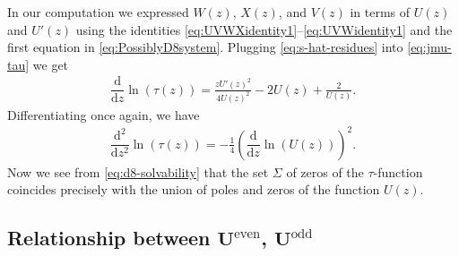 In our computation we expressed $W(z)$, $X(z)$, and $V(z)$ in terms of $U(z)$ and $U'(z)$ using the identities \eqref{eq:UVWXidentity1}--\eqref{eq:UVWidentity1} and the first equation in \eqref{eq:PossiblyD8system}. Plugging \eqref{eq:s-hat-residues} into \eqref{eq:jmu-tau} we get
\begin{gather*}
\dfrac{\mathrm{d}}{\mathrm{d}z}\ln(\tau(z))=\frac{zU'(z)^2}{4U(z)^2}-
 2 U(z)+\frac2{U(z)}.
\end{gather*}
Differentiating once again, we have
\begin{gather} \label{eq:d8-solvability}
\dfrac{\mathrm{d}^2}{\mathrm{d}z^2}\ln(\tau(z))=-\frac{1}{4}\left(\dfrac{\mathrm{d}}{\mathrm{d}z}\ln(U(z))\right)^2.
\end{gather}
 Now we see from \eqref{eq:d8-solvability} that the set $\Sigma$ of zeros of the $\tau$-function coincides precisely with the union of poles and zeros of the function $U(z)$.

\subsection[Relationship between U\^{}\{even\}, U\^{}\{odd\}]{Relationship between $\boldsymbol{U^{\mathrm{even}}}$, $\boldsymbol{U^{\mathrm{odd}}}$}

